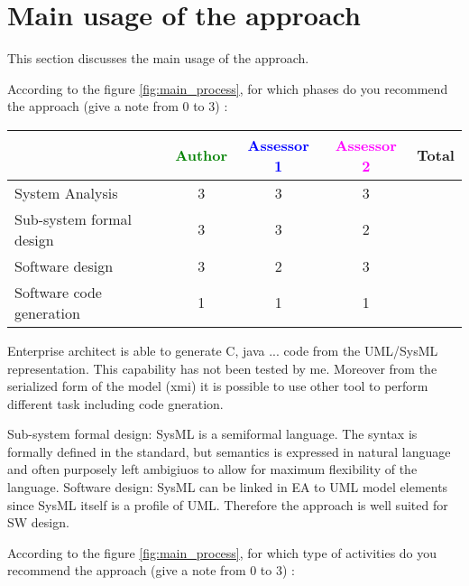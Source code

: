 \section{Main usage of the approach}
\label{main_usage}
This section discusses the main usage of the approach.

According to the figure \ref{fig:main_process}, for which phases do you recommend the approach (give a note from 0 to  3) :

\begin{tabular}{|l | c | c | c | c|}
\hline
& \textcolor{green}{Author} & \textcolor{blue}{Assessor 1} & \textcolor{magenta}{Assessor 2} & Total \\
\hline 
System Analysis & 3  & 3 & 3 &  \\
\hline
Sub-system formal design & 3 & 3 & 2 & \\
\hline
Software design & 3 & 2 & 3 & \\
\hline
Software code generation & 1 & 1 & 1 & \\
\hline
\end{tabular}
\begin{author_comment}
Enterprise architect is able to generate C, java ... code from the UML/SysML
representation. This capability has not been tested by me. Moreover
from the serialized form of the model (xmi) it is possible to use
other tool to perform different task including code gneration.
\end{author_comment}
\begin{assessor2}
Sub-system formal design: SysML is a semiformal language. The syntax is formally defined in the standard, but semantics is expressed in natural language and often purposely left ambigiuos to allow for maximum flexibility of the language.
Software design: SysML can be linked in EA to UML model elements since SysML itself is a profile of UML. Therefore the approach is well suited for SW design.
\end{assessor2}

According to the figure \ref{fig:main_process}, for which type of activities do you recommend the approach (give a note from 0 to  3) :

